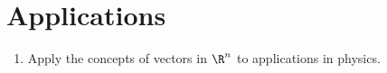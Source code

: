 \newpage
\section{Applications}

\begin{outcome}
  \begin{enumerate}
  \item Apply the concepts of vectors in $\R^n$ to applications in
    physics.
  \end{enumerate}
\end{outcome}
